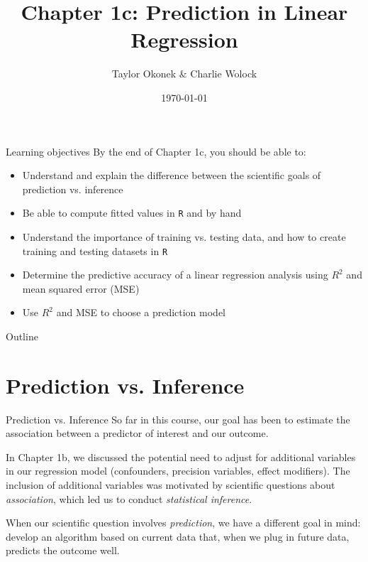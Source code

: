 \documentclass[10pt,t]{beamer}
\title{Chapter 1c: Prediction in Linear Regression}
\author{Taylor Okonek \& Charlie Wolock}
\date{\today}
\begin{document}
	\begin{frame}
	\titlepage 
\end{frame}

\begin{frame}{Learning objectives}
By the end of Chapter 1c, you should be able to:

\vspace{0.3cm} 
\begin{itemize}
	\item Understand and explain the difference between the scientific goals of prediction vs. inference
	\item Be able to compute fitted values in \texttt{R} and by hand
	\item Understand the importance of training vs. testing data, and how to create training and testing datasets in \texttt{R}
	\item Determine the predictive accuracy of a linear regression analysis using $R^2$ and mean squared error (MSE)
	\item Use $R^2$ and MSE to choose a prediction model
\end{itemize}
\end{frame}

\begin{frame}{Outline}
\tableofcontents
\end{frame}




\section{Prediction vs. Inference}

\begin{frame}{Prediction vs. Inference}
So far in this course, our goal has been to estimate the association between a predictor of interest and our outcome.

\vspace{0.3cm}

In Chapter 1b, we discussed the potential need to adjust for additional variables in our regression model (confounders, precision variables, effect modifiers). The inclusion of additional variables was motivated by scientific questions about \textit{association}, which led us to conduct \textit{statistical inference}.

\vspace{0.3cm}

When our scientific question involves \textit{prediction}, we have a different goal in mind: develop an algorithm based on current data that, when we plug in future data, predicts the outcome well.
\end{frame}
\end{document}
